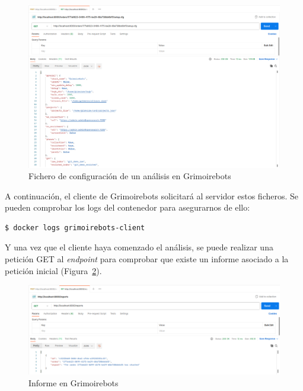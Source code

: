 \begin{figure}[ht]
    \centering
    \includegraphics[width=\textwidth]{Figures/example5}
    \decoRule
    \caption[Análisis en Grimoirebots (Fichero de configuración)]{Fichero de configuración de un análisis en Grimoirebots}
    \label{fig:example5}
\end{figure}

A continuación, el cliente de Grimoirebots solicitará al servidor estos ficheros. Se pueden comprobar los logs del contenedor para asegurarnos de ello:

\begin{lstlisting}[language=bash]
$ docker logs grimoirebots-client
\end{lstlisting}

Y una vez que el cliente haya comenzado el análisis, se puede realizar una petición GET al \emph{endpoint}  para comprobar que existe un informe asociado a la petición inicial (Figura~\ref{fig:example6}).

\begin{figure}[ht]
    \centering
    \includegraphics[width=\textwidth]{Figures/example6}
    \decoRule
    \caption[Grimoirebots (Informe)]{Informe en Grimoirebots}
    \label{fig:example6}
\end{figure}

